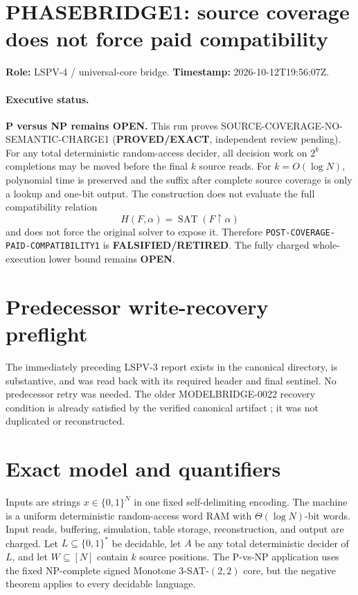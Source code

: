 \documentclass[11pt]{article}
\newcommand{\PROVED}{\textbf{PROVED/EXACT}}
\newcommand{\OPEN}{\textbf{OPEN}}
\newcommand{\RET}{\textbf{FALSIFIED/RETIRED}}
\begin{document}
\section*{PHASEBRIDGE1: source coverage does not force paid compatibility}
\textbf{Role:} LSPV-4 / universal-core bridge. \quad
\textbf{Timestamp:} 2026-10-12T19:56:07Z.

\paragraph{Executive status.}
\textbf{P versus NP remains OPEN.}
This run proves \textsf{SOURCE-COVERAGE-NO-SEMANTIC-CHARGE1}
(\PROVED, independent review pending). For any total deterministic
random-access decider, all decision work on \(2^k\) completions may be moved
before the final \(k\) source reads. For \(k=O(\log N)\), polynomial time is
preserved and the suffix after complete source coverage is only a lookup and
one-bit output. The construction does not evaluate the full compatibility
relation
\[
H(F,\alpha)=\operatorname{SAT}(F\upharpoonright\alpha)
\]
and does not force the original solver to expose it. Therefore
\texttt{POST-COVERAGE-PAID-COMPATIBILITY1} is \RET. The fully charged
whole-execution lower bound remains \OPEN.

\section*{Predecessor write-recovery preflight}
The immediately preceding LSPV-3 report
 exists in
the canonical directory, is substantive, and was read back with its required
header and final sentinel. No predecessor retry was needed. The older
MODELBRIDGE-0022 recovery condition is already satisfied by the verified
canonical artifact
;
it was not duplicated or reconstructed.

\section*{Exact model and quantifiers}
Inputs are strings \(x\in\{0,1\}^N\) in one fixed self-delimiting encoding.
The machine is a uniform deterministic random-access word RAM with
\(\Theta(\log N)\)-bit words. Input reads, buffering, simulation, table
storage, reconstruction, and output are charged. Let \(L\subseteq\{0,1\}^*\)
be decidable, let \(A\) be any total deterministic decider of \(L\), and let
\(W\subseteq[N]\) contain \(k\) source positions. The P-vs-NP application
uses the fixed NP-complete signed Monotone \(3\)-SAT-\((2,2)\) core, but the
negative theorem applies to every decidable language.
\end{document}

